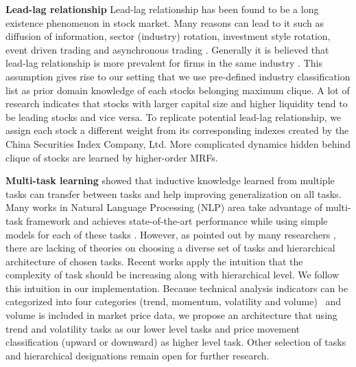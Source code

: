 \documentclass[sigconf,anonymous,review]{acmart}
\renewcommand{\citename}{\citet}
\renewcommand{\cite}{\citep}
\begin{document}
\textbf{Lead-lag relationship} Lead-lag relationship has been found to be a long existence phenomenon in stock market. Many reasons can lead to it such as diffusion of information, sector (industry) rotation, investment style rotation, event driven trading and asynchronous trading
\cite{lo1990contrarian,chordia2000trading,conrad1988time,hameed1997time}. Generally it is believed that lead-lag relationship is more prevalent for firms in the same industry \cite{hou2007industry}. This assumption gives rise to our setting that we use pre-defined industry classification list \cite{ths} as prior domain knowledge of each stock\textquotesingle s belonging maximum
clique. A lot of research \cite{brennan1993investment,hou2007industry,badrinath1995shepherds,mcqueen1996delayed}
indicates that stocks with larger capital size and higher liquidity tend to be leading stocks and vice versa.
To replicate potential lead-lag relationship, we assign each stock a different weight from its corresponding indexes created by the China Securities Index Company, Ltd. More complicated dynamics hidden behind clique
of stocks are learned by higher-order MRFs.

\textbf{Multi-task learning} \citename{caruana1993multitask}
showed that inductive knowledge learned from multiple tasks can
transfer between tasks and help improving generalization on all
tasks. Many works in Natural Language Processing (NLP) area take
advantage of multi-task framework and achieves state-of-the-art
performance while using simple models for each of these tasks
\cite{sogaard2016deep,hashimoto2016joint}. However, as pointed
out by many researchers
\cite{caruana1993multitask,ruder2017overview}, there are lacking
of theories on choosing a diverse set of tasks and hierarchical
architecture of chosen tasks. Recent works
\cite{sogaard2016deep,hashimoto2016joint} apply the intuition
that the complexity of task should be increasing along with
hierarchical level. We follow this intuition in our
implementation. Because technical analysis indicators can be
categorized into four categories (trend, momentum, volatility and
volume)~\cite{kirkpatrick2010technical} and volume is included in
market price data, we propose an architecture that using trend
and volatility tasks as our lower level tasks and price movement
classification (upward or downward) as higher level task. Other
selection of tasks and hierarchical designations remain open for
further research.
\end{document}

